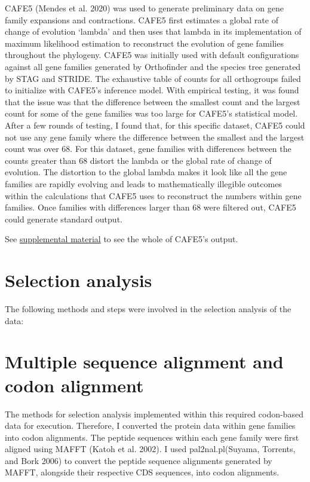 CAFE5 (Mendes et al. 2020) was used to generate preliminary data on gene family expansions and contractions. CAFE5 first estimates a global rate of change of evolution ‘lambda’ and then uses that lambda in its implementation of maximum likelihood estimation to reconstruct the evolution of gene families throughout the phylogeny. CAFE5 was initially used with default configurations against all gene families generated by Orthofinder and the species tree generated by STAG and STRIDE. The exhaustive table of counts for all orthogroups failed to initialize with CAFE5's inference model. With empirical testing, it was found that the issue was that the difference between the smallest count and the largest count for some of the gene families was too large for CAFE5's statistical model. After a few rounds of testing, I found that, for this specific dataset, CAFE5 could not use any gene family where the difference between the smallest and the largest count was over 68. For this dataset, gene families with differences between the counts greater than 68 distort the lambda or the global rate of change of evolution. The distortion to the global lambda makes it look like all the gene families are rapidly evolving and leads to mathematically illegible outcomes within the calculations that CAFE5 uses to reconstruct the numbers within gene families. Once families with differences larger than 68 were filtered out, CAFE5 could generate standard output. 

See \href{https://uah0-my.sharepoint.com/:f:/g/personal/rrd0009_uah_edu/Ei4yllknzK1Pnpm-hP94YRwBiYsHdd3LY2wt4RsgAav8Fg?e=CjITze}{supplemental material} to see the whole of CAFE5’s output.

\section{Selection analysis}

The following methods and steps were involved in the selection analysis of the data:

\section{Multiple sequence alignment and codon alignment}

The methods for selection analysis implemented within this required codon-based data for execution. Therefore, I converted the protein data within gene families into codon alignments. The peptide sequences within each gene family were first aligned using MAFFT (Katoh et al. 2002). I used pal2nal.pl(Suyama, Torrents, and Bork 2006) to convert the peptide sequence alignments generated by MAFFT, alongside their respective CDS sequences, into codon alignments.

